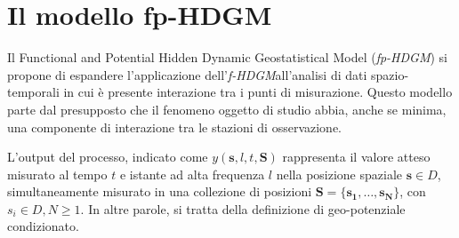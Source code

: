 \section[Il modello fp-HDGM]{Il modello fp-HDGM}
Il Functional and Potential Hidden Dynamic Geostatistical Model (\textit{fp-HDGM}) si propone di espandere l'applicazione dell'\textit{f-HDGM}all'analisi di dati spazio-temporali in cui è presente interazione tra i punti di misurazione. Questo modello parte dal presupposto che il fenomeno oggetto di studio abbia, anche se minima, una componente di interazione tra le stazioni di osservazione.
\par L'output del processo, indicato come $y(\mathbf{s}, l, t,\mathbf{S})$ rappresenta il valore atteso misurato al tempo $t$ e istante ad alta frequenza $l$ nella posizione spaziale $\mathbf{s} \in D$, simultaneamente misurato in una collezione di posizioni $\mathbf{S} = \{\mathbf{s_1}, \ldots, \mathbf{s_N}\}$,  con $s_i \in D, N \geq 1$. In altre parole, si tratta della definizione di geo-potenziale condizionato.

